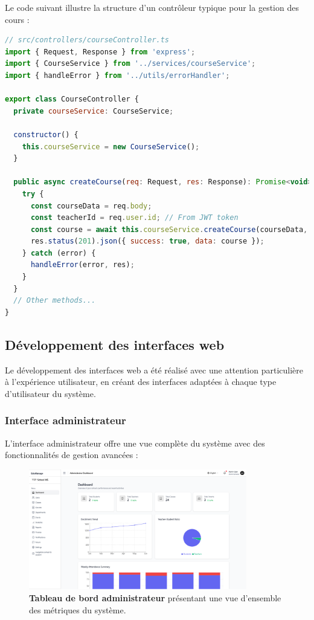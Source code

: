 Le code suivant illustre la structure d'un contrôleur typique pour la gestion des cours :

\begin{lstlisting}[style=codestyle, language=JavaScript]
// src/controllers/courseController.ts
import { Request, Response } from 'express';
import { CourseService } from '../services/courseService';
import { handleError } from '../utils/errorHandler';

export class CourseController {
  private courseService: CourseService;
  
  constructor() {
    this.courseService = new CourseService();
  }
  
  public async createCourse(req: Request, res: Response): Promise<void> {
    try {
      const courseData = req.body;
      const teacherId = req.user.id; // From JWT token
      const course = await this.courseService.createCourse(courseData, teacherId);
      res.status(201).json({ success: true, data: course });
    } catch (error) {
      handleError(error, res);
    }
  }
  // Other methods...
}
\end{lstlisting}

\subsection{Développement des interfaces web}

Le développement des interfaces web a été réalisé avec une attention particulière à l'expérience utilisateur, en créant des interfaces adaptées à chaque type d'utilisateur du système.

\subsubsection{Interface administrateur}

L'interface administrateur offre une vue complète du système avec des fonctionnalités de gestion avancées :

\begin{figure}[H]
  \centering
  \includegraphics[width=0.85\textwidth,keepaspectratio]{pfe-pics/admin/Screenshot 2025-06-09 at 22-38-06 Vite React TS.png}
  \caption{\textbf{Tableau de bord administrateur} présentant une vue d'ensemble des métriques du système.}
  \label{fig:admin_dashboard}
\end{figure}

